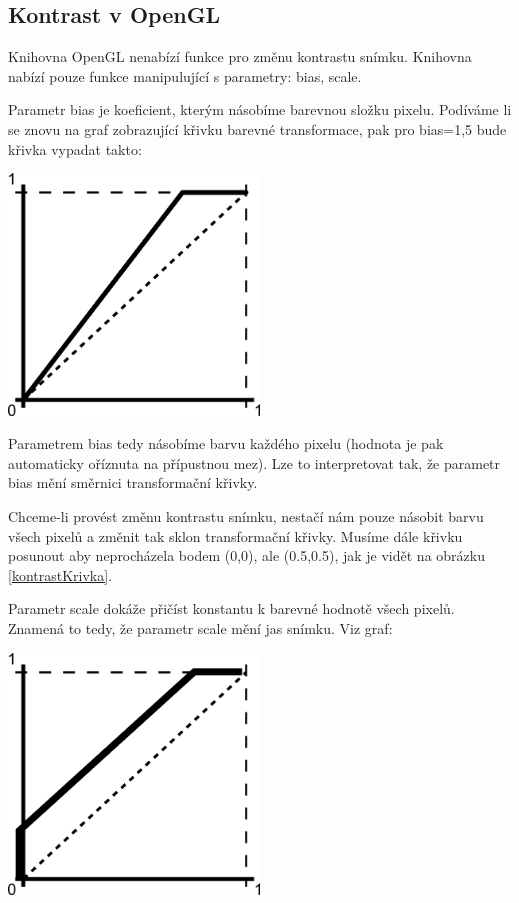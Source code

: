 \subsection{Kontrast v OpenGL}
Knihovna OpenGL nenabízí funkce pro změnu kontrastu snímku. Knihovna nabízí pouze funkce manipulující s parametry: bias, scale.

Parametr bias je koeficient, kterým násobíme barevnou složku pixelu. Podíváme li se znovu na graf zobrazující křivku barevné transformace, pak pro bias=1,5 bude křivka vypadat takto:

\begin{center}
\includegraphics[width=0.5\textwidth]{Text/IMG/Bias.png}
\end{center}

Parametrem bias tedy násobíme barvu každého pixelu (hodnota je pak automaticky oříznuta na přípustnou mez). Lze to interpretovat tak, že parametr bias mění směrnici transformační křivky.

Chceme-li provést změnu kontrastu snímku, nestačí nám pouze násobit barvu všech pixelů a změnit tak sklon transformační křivky. Musíme dále křivku posunout aby neprocházela bodem (0,0), ale (0.5,0.5), jak je vidět na obrázku \ref{kontrastKrivka}.

Parametr scale dokáže přičíst konstantu k barevné hodnotě všech pixelů. Znamená to tedy, že parametr scale mění jas snímku. Viz graf:

\begin{center}
\includegraphics[width=0.5\textwidth]{Text/IMG/Scale.png}
\end{center}

